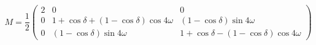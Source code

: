 \documentclass[a4paper,10pt]{article}
\begin{document}

\begin{equation}
M = \frac{1}{2}\left(\begin{array}{rrr}
2 & 0 & 0 \\
0 & 1+\cos\delta + (1-\cos\delta)\cos4\omega & (1-\cos\delta)\sin4\omega \\
0 & (1-\cos\delta)\sin4\omega & 1+\cos\delta -
(1-\cos\delta)\cos4\omega\end{array}\right)
\end{equation}
\end{document}
